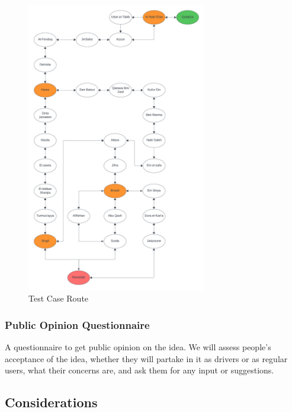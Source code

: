 \documentclass[a4paper, 12pt]{article} %
\begin{document}
                \begin{figure}[h]
                    \centering
                    \includegraphics[width=0.7\textwidth, keepaspectratio]{Images/Route_Text_Case.png}
                    \caption{Test Case Route\protect \footnotemark[1]}
                    \label{fig:testcase_route}
                \end{figure}

                \pagebreak
                
            \subsubsection{Public Opinion Questionnaire}
                A questionnaire to get public opinion on the idea. We will assess people's acceptance of the idea, whether they will partake in it as drivers or as regular users, what their concerns are, and ask them for any input or suggestions.

            \subsection{Considerations}
\end{document}
